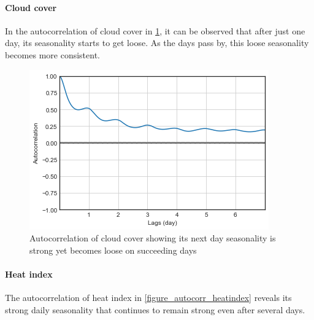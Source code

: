 \paragraph{Cloud cover}

In the autocorrelation of cloud cover in \ref{figure_autocorr_cloudcover}, it can be observed that after just one day, its seasonality starts to get loose. As the days pass by, this loose seasonality becomes more consistent.


\begin{figure}
  \includegraphics[width=\linewidth]
  {figures/figure_autocorr_cloudcover.png}
  \caption{ Autocorrelation of cloud cover showing its next day seasonality is strong yet becomes loose on succeeding days}
  \label{figure_autocorr_cloudcover}
\end{figure}


\paragraph{Heat index}

The autocorrelation of heat index in \ref{figure_autocorr_heatindex} reveals its strong daily seasonality that continues to remain strong even after several days. 

